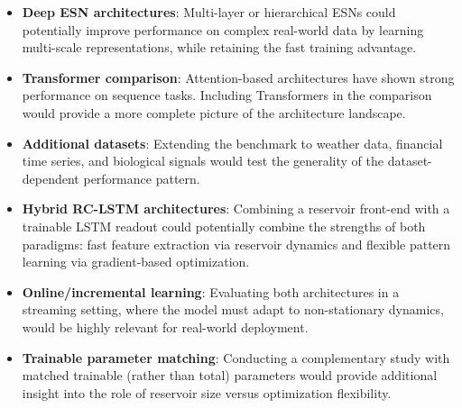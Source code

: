 \begin{itemize}
    \item \textbf{Deep ESN architectures}: Multi-layer or hierarchical ESNs could potentially improve performance on complex real-world data by learning multi-scale representations, while retaining the fast training advantage.

    \item \textbf{Transformer comparison}: Attention-based architectures have shown strong performance on sequence tasks. Including Transformers in the comparison would provide a more complete picture of the architecture landscape.

    \item \textbf{Additional datasets}: Extending the benchmark to weather data, financial time series, and biological signals would test the generality of the dataset-dependent performance pattern.

    \item \textbf{Hybrid RC-LSTM architectures}: Combining a reservoir front-end with a trainable LSTM readout could potentially combine the strengths of both paradigms: fast feature extraction via reservoir dynamics and flexible pattern learning via gradient-based optimization.

    \item \textbf{Online/incremental learning}: Evaluating both architectures in a streaming setting, where the model must adapt to non-stationary dynamics, would be highly relevant for real-world deployment.

    \item \textbf{Trainable parameter matching}: Conducting a complementary study with matched trainable (rather than total) parameters would provide additional insight into the role of reservoir size versus optimization flexibility.
\end{itemize}
